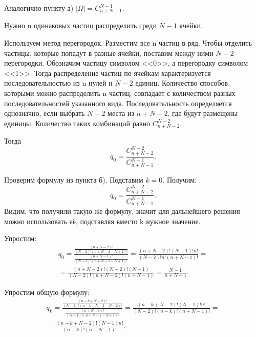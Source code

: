 \begin{enumerate}[label=\alph*)]
Аналогично пункту а) $  | \Omega | = C_{n+N-1}^{N-1}  $.

Нужно n одинаковых частиц распределить среди $ N - 1 $ ячейки.

Используем метод перегородок.
Разместим все n частиц в ряд.
Чтобы отделить частицы, которые попадут в разные ячейки, поставим между ними $ N - 2 $ перегородки.
Обозначим частицу символом <<0>>, а перегородку символом <<1>>.
Тогда распределение частиц по ячейкам характеризуется последовательностью из n нулей и $ N - 2 $ единиц.
Количество способов, которыми можно распределить n частиц, совпадает с количеством разных последовательностей указанного вида.
Последовательность определяется однозначно, если выбрать $ N - 2 $ места из $ n + N - 2 $, где будут размещены единицы.
Количество таких комбинаций равно $ C_{n+N-2}^{N-2} $.

Тогда
$$ q_0 =
\frac{C_{n+N-2}^{N-2}}{C_{n+N-1}^{N-1}}.$$

Проверим формулу из пункта б).
Подставим $ k = 0 $.
Получим:
$$ q_0 =
\frac{C_{n+N-2}^{N-2}}{C_{n+N-1}^{N-1}}.$$
Видим, что получили такую же формулу, значит для дальнейшего решения можно использовать её, подставляя вместо k нужное значение.

Упростим:
\begin{equation*}
\begin{split}
q_0 =
\frac{ \frac{ \left( n+N-2 \right)! }{ \left( N-2 \right)! \left( n+N-2-N+2 \right)!  } }{ \frac{ \left( n+N-1\right)! }{\left( N-1 \right)! \left( n+N-1-N+1 \right)!  } } =
\frac{ \left( n+N-2\right)! \left( N-1 \right)!n!}{ \left( N-2 \right)!n! \left( n+N-1 \right)! } = \\
= \frac{ \left( n+N-2 \right)! \left( N-2 \right)! \left( N-1 \right) }{ \left( N-2 \right)! \left( n+N-2 \right)! \left( n+N-1 \right) } =
\frac{N-1}{n+N-1}.
\end{split}
\end{equation*}

Упростим общую формулу:
\begin{equation*}
\begin{split}
q_k =
\frac{ \frac{ \left( n-k+N-2 \right)! }{ \left( N-2 \right)! \left( n-k+N-2-N+2 \right)! } }{ \frac{ \left( n+N-1 \right)!}{ \left( N-1 \right)! \left(n+N-1-N+1 \right)!} } =
\frac{ \left( n-k+N-2 \right)! \left( N-1 \right)!n!}{ \left( N-2 \right)! \left( n-k \right)! \left( n+N-1 \right)!} = \\
= \frac{ \left( n-k+N-2 \right)! \left( N-1 \right) n!}{ \left( n-k \right)! \left( n+N-1 \right)!}.
\end{split}
\end{equation*}


\end{enumerate}
